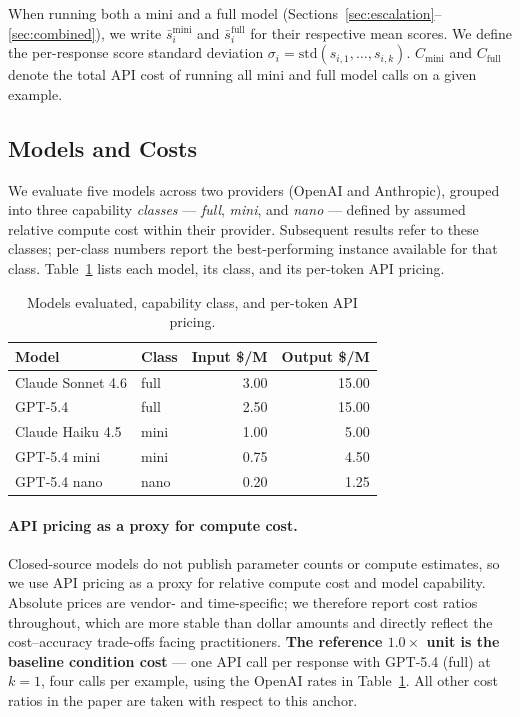 \documentclass{article}
\begin{document}
When running both a mini and a full model (Sections~\ref{sec:escalation}--\ref{sec:combined}), we write $\bar{s}_i^{\text{mini}}$ and $\bar{s}_i^{\text{full}}$ for their respective mean scores. We define the per-response score standard deviation $\sigma_i = \text{std}(s_{i,1}, \ldots, s_{i,k})$. $C_{\text{mini}}$ and $C_{\text{full}}$ denote the total API cost of running all mini and full model calls on a given example.

\subsection{Models and Costs}
\label{sec:models}

We evaluate five models across two providers (OpenAI and Anthropic), grouped into three capability \emph{classes} --- \emph{full}, \emph{mini}, and \emph{nano} --- defined by assumed relative compute cost within their provider. Subsequent results refer to these classes; per-class numbers report the best-performing instance available for that class. Table~\ref{tab:models} lists each model, its class, and its per-token API pricing.

\begin{table}[ht]
\centering
\caption{Models evaluated, capability class, and per-token API pricing.}
\label{tab:models}
\small
\begin{tabular}{llrr}
\toprule
Model              & Class & Input \$/M & Output \$/M \\
\midrule
Claude Sonnet 4.6  & full  & 3.00 & 15.00 \\
GPT-5.4            & full  & 2.50 & 15.00 \\
Claude Haiku 4.5   & mini  & 1.00 & 5.00  \\
GPT-5.4 mini       & mini  & 0.75 & 4.50  \\
GPT-5.4 nano       & nano  & 0.20 & 1.25  \\
\bottomrule
\end{tabular}
\end{table}

\paragraph{API pricing as a proxy for compute cost.} Closed-source models do not publish parameter counts or compute estimates, so we use API pricing as a proxy for relative compute cost and model capability. Absolute prices are vendor- and time-specific; we therefore report cost ratios throughout, which are more stable than dollar amounts and directly reflect the cost--accuracy trade-offs facing practitioners. \textbf{The reference $1.0\times$ unit is the baseline condition cost} --- one API call per response with GPT-5.4 (full) at $k{=}1$, four calls per example, using the OpenAI rates in Table~\ref{tab:models}. All other cost ratios in the paper are taken with respect to this anchor.
\end{document}
